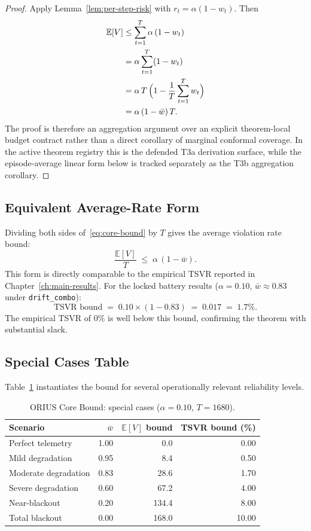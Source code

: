 \begin{proof}
Apply Lemma~\ref{lem:per-step-risk} with $r_t=\alpha(1-w_t)$.  Then
\begin{align}
  \mathbb{E}[V]
  &\le \sum_{t=1}^T \alpha\,(1 - w_t) \nonumber \\
  &= \alpha \sum_{t=1}^T (1 - w_t) \nonumber \\
  &= \alpha\,T\,\Bigl(1 - \frac{1}{T}\sum_{t=1}^T w_t\Bigr) \nonumber \\
  &= \alpha\,(1 - \bar{w})\,T. \label{eq:core-bound}
\end{align}
The proof is therefore an aggregation argument over an explicit theorem-local
budget contract rather than a direct corollary of marginal conformal coverage.
In the active theorem registry this is the defended T3a derivation surface,
while the episode-average linear form below is tracked separately as the T3b
aggregation corollary.
\end{proof}

\subsection{Equivalent Average-Rate Form}

Dividing both sides of~\eqref{eq:core-bound} by $T$ gives the
average violation rate bound:
\[
  \frac{\mathbb{E}[V]}{T} \;\le\; \alpha\,(1 - \bar{w}).
\]
This form is directly comparable to the empirical TSVR reported in
Chapter~\ref{ch:main-results}.  For the locked battery results
($\alpha = 0.10$, $\bar{w} \approx 0.83$ under \texttt{drift\_combo}):
\[
  \text{TSVR bound} \;=\; 0.10 \times (1 - 0.83) \;=\; 0.017 \;=\; 1.7\%.
\]
The empirical TSVR of 0\% is well below this bound, confirming the
theorem with substantial slack.

\subsection{Special Cases Table}

Table~\ref{tab:core-bound-cases} instantiates the bound for several
operationally relevant reliability levels.

\begin{table}[ht]
\centering
\caption{ORIUS Core Bound: special cases ($\alpha = 0.10$, $T = 1680$).}
\label{tab:core-bound-cases}
\begin{tabular}{lrrr}
\toprule
\textbf{Scenario} & $\bar{w}$ & \textbf{$\mathbb{E}[V]$ bound} &
  \textbf{TSVR bound (\%)} \\
\midrule
Perfect telemetry    & 1.00 &   0.0 & 0.00 \\
Mild degradation     & 0.95 &   8.4 & 0.50 \\
Moderate degradation & 0.83 &  28.6 & 1.70 \\
Severe degradation   & 0.60 &  67.2 & 4.00 \\
Near-blackout        & 0.20 & 134.4 & 8.00 \\
Total blackout       & 0.00 & 168.0 & 10.00 \\
\bottomrule
\end{tabular}
\end{table}

